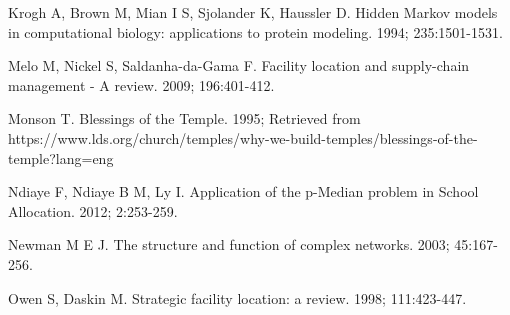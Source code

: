 \documentclass[twoside,twocolumn]{article}
\begin{document}
\begin{thebibliography}{99}
Krogh A, Brown M, Mian I S, Sjolander K, Haussler D.
\newblock Hidden Markov models in computational biology: applications to protein modeling.
 1994; 235:1501-1531.

Melo M, Nickel S, Saldanha-da-Gama F.
\newblock Facility location and supply-chain management - A review.
  2009; 196:401-412.

Monson T.
\newblock Blessings of the Temple. 1995;
\newblock Retrieved from https://www.lds.org/church/temples/why-we-build-temples/blessings-of-the-temple?lang=eng

Ndiaye F, Ndiaye B M, Ly I.
\newblock Application of the p-Median problem in School Allocation.
 2012; 2:253-259.

Newman M E J.
\newblock The structure and function of complex networks.
 2003; 45:167-256.

Owen S, Daskin M.
\newblock Strategic facility location: a review.
 1998; 111:423-447.

\end{thebibliography}
\end{document}
